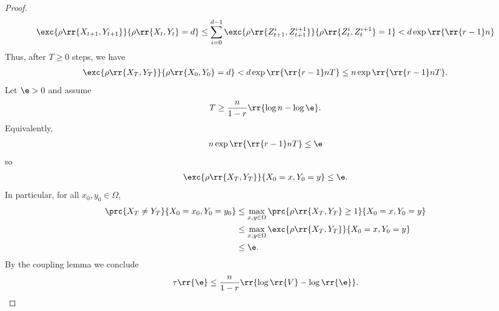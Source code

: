 \documentclass{article}
\begin{document}
\begin{claim*}[5]
\begin{proof}
    \begin{align*}
      \exc{\rho\rr{X_{t+1},Y_{t+1}}}{\rho\rr{X_t,Y_t}=d} \leq \sum_{i=0}^{d-1}\exc{\rho\rr{Z_{t+1}^i,Z_{t+1}^{i+1}}}{\rho\rr{Z_t^i,Z_t^{i+1}}=1} < d\exp\rr{\rr{r-1}n}
    \end{align*}
    Thus, after $T\geq 0$ steps, we have
    \begin{align*}
      \exc{\rho\rr{X_T,Y_T}}{\rho\rr{X_0,Y_0}=d} < d\exp\rr{\rr{r-1}nT} \leq n\exp\rr{\rr{r-1}nT}.
    \end{align*}
    Let $\e>0$ and assume
    \begin{align*}
      T \geq \frac{n}{1-r}\rr{\log n-\log\e}.
    \end{align*}
    Equivalently,
    \begin{align*}
      n\exp\rr{\rr{r-1}nT} \leq \e
    \end{align*}
    so
    \begin{align*}
      \exc{\rho\rr{X_T,Y_T}}{X_0=x,Y_0=y} \leq \e.
    \end{align*}
    In particular, for all $x_0,y_0\in\Omega$,
    \begin{align*}
      \prc{X_T\neq Y_T}{X_0=x_0,Y_0=y_0}
      &\leq \max_{x,y\in\Omega} \prc{\rho\rr{X_T,Y_T}\geq 1}{X_0=x,Y_0=y} \\
      &\leq \max_{x,y\in\Omega} \exc{\rho\rr{X_T,Y_T}}{X_0=x,Y_0=y} \\
      &\leq \e.
    \end{align*}
    By the coupling lemma we conclude
    \begin{align*}
      \tau\rr{\e}\leq \frac{n}{1-r}\rr{\log\rr{V}-\log\rr{\e}}.
    \end{align*}
  \end{proof}
\end{claim*}
\end{document}
